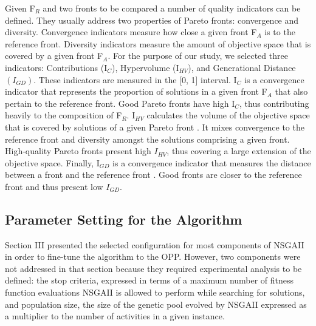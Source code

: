 \documentclass[conference]{IEEEtran}
\begin{document}
Given F$_{R}$ and two fronts to be compared a number of quality indicators can be defined. They usually address two properties of Pareto fronts: convergence and diversity. Convergence indicators measure how close a given front F$_{A}$ is to the reference front. Diversity indicators measure the amount of objective space that is covered by a given front F$_{A}$. For the purpose of our study, we selected three indicators: Contributions (I$_{C}$), Hypervolume (I$_{HV}$), and Generational Distance $(I_{GD})$. These indicators are measured in the [0, 1] interval. I$_{C}$ is a convergence indicator that represents the proportion of solutions in a given front F$_{A}$ that also pertain to the reference front. Good Pareto fronts have high I$_{C}$, thus contributing heavily to the composition of F$_{R}$. I$_{HV}$ calculates the volume of the objective space that is covered by solutions of a given Pareto front \cite{Durillo:2009}. It mixes convergence to the reference front and diversity amongst the solutions comprising a given front. High-quality Pareto fronts present high $I_{HV}$, thus covering a large extension of the objective space. Finally, I$_{GD}$ is a convergence indicator that measures the distance between a front and the reference front \cite{vanveldhuizen:1998}. Good fronts are closer to the reference front and thus present low $I_{GD}$.

\subsection{Parameter Setting for the Algorithm}
Section III presented the selected configuration for most components of NSGAII in order to fine-tune the algorithm to the OPP. However, two components were not addressed in that section because they required experimental analysis to be defined: the stop criteria, expressed in terms of a maximum number of fitness function evaluations NSGAII is allowed to perform while searching for solutions, and population size, the size of the genetic pool evolved by NSGAII expressed as a multiplier to the number of activities in a given instance.
\end{document}
